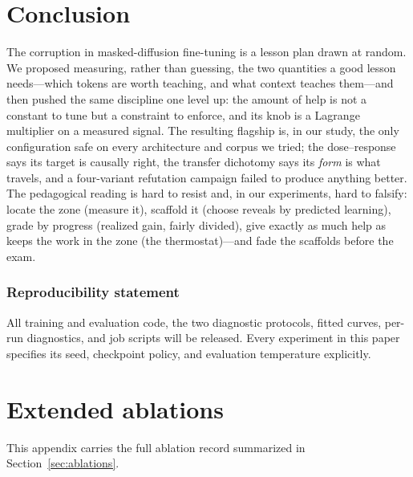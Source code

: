 \documentclass{article} %
\begin{document}
\section{Conclusion}

The corruption in masked-diffusion fine-tuning is a lesson plan drawn at random. We proposed measuring, rather than guessing, the two quantities a good lesson needs---which tokens are worth teaching, and what context teaches them---and then pushed the same discipline one level up: the amount of help is not a constant to tune but a constraint to enforce, and its knob is a Lagrange multiplier on a measured signal. The resulting flagship is, in our study, the only configuration safe on every architecture and corpus we tried; the dose--response says its target is causally right, the transfer dichotomy says its \emph{form} is what travels, and a four-variant refutation campaign failed to produce anything better. The pedagogical reading is hard to resist and, in our experiments, hard to falsify: locate the zone (measure it), scaffold it (choose reveals by predicted learning), grade by progress (realized gain, fairly divided), give exactly as much help as keeps the work in the zone (the thermostat)---and fade the scaffolds before the exam.

\subsubsection*{Reproducibility statement}
All training and evaluation code, the two diagnostic protocols, fitted curves, per-run diagnostics, and job scripts will be released. Every experiment in this paper specifies its seed, checkpoint policy, and evaluation temperature explicitly.




\appendix

\section{Extended ablations}
\label{app:ablations}
\label{sec:v2results}
\label{sec:v2method}
\label{sec:refute}

This appendix carries the full ablation record summarized in Section~\ref{sec:ablations}.
\end{document}
